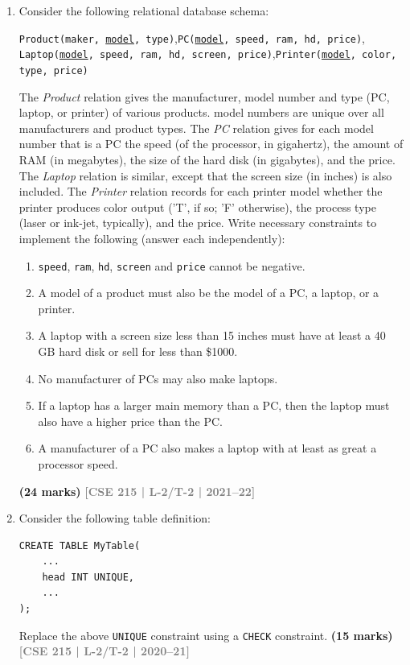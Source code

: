\documentclass[12pt]{article}
\newcommand{\yr}[1]{\hfill\textcolor{gray}{\small\textbf{[#1]}}}
\newcommand{\mk}[1]{\textcolor{orange!70!black}{\small\textbf{(#1 marks)}}}
\begin{document}
\begin{enumerate}
\item Consider the following relational database schema:
\begin{center}
\texttt{Product(maker, \underline{model}, type)},\quad \texttt{PC(\underline{model}, speed, ram, hd, price)},\\
\texttt{Laptop(\underline{model}, speed, ram, hd, screen, price)},\quad \texttt{Printer(\underline{model}, color, type, price)}
\end{center}
The \textit{Product} relation gives the manufacturer, model number and type (PC, laptop, or printer) of various products. model numbers are unique over all manufacturers and product types. The \textit{PC} relation gives for each model number that is a PC the speed (of the processor, in gigahertz), the amount of RAM (in megabytes), the size of the hard disk (in gigabytes), and the price. The \textit{Laptop} relation is similar, except that the screen size (in inches) is also included. The \textit{Printer} relation records for each printer model whether the printer produces color output ('T', if so; 'F' otherwise), the process type (laser or ink-jet, typically), and the price.
Write necessary constraints to implement the following (answer each independently):
\begin{enumerate}
  \item \texttt{speed}, \texttt{ram}, \texttt{hd}, \texttt{screen} and \texttt{price} cannot be negative.
  \item A model of a product must also be the model of a PC, a laptop, or a printer.
  \item A laptop with a screen size less than 15 inches must have at least a 40 GB hard disk or sell for less than \$1000.
  \item No manufacturer of PCs may also make laptops.
  \item If a laptop has a larger main memory than a PC, then the laptop must also have a higher price than the PC.
  \item A manufacturer of a PC also makes a laptop with at least as great a processor speed.
\end{enumerate}
\mk{24} \yr{CSE 215 | L-2/T-2 | 2021--22}


\item Consider the following table definition:
\begin{lstlisting}
CREATE TABLE MyTable(
    ...
    head INT UNIQUE,
    ...
);
\end{lstlisting}
Replace the above \texttt{UNIQUE} constraint using a \texttt{CHECK} constraint.
\mk{15} \yr{CSE 215 | L-2/T-2 | 2020--21}



\end{enumerate}
\end{document}
